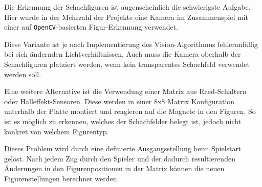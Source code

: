 Die Erkennung der Schachfiguren ist augenscheinlich die schwierigste
Aufgabe. Hier wurde in der Mehrzahl der Projekte eine Kamera im
Zusammenspiel mit einer auf \passthrough{\lstinline!OpenCV!}-basierten
Figur-Erkennung verwendet.

Diese Variante ist je nach Implementierung des Vision-Algorithmus
fehleranfällig bei sich ändernden Lichtverhältnissen. Auch muss die
Kamera oberhalb der Schachfiguren platziert werden, wenn kein
transparentes Schachfeld verwendet werden soll.

Eine weitere Alternative ist die Verwendung einer Matrix aus
Reed-Schaltern oder Halleffekt-Sensoren. Diese werden in einer 8x8
Matrix Konfiguration unterhalb der Platte montiert und reagieren auf die
Magnete in den Figuren. So ist es möglich zu erkennen, welches der
Schachfelder belegt ist, jedoch nicht konkret von welchem Figurentyp.

Dieses Problem wird durch eine definierte Ausgangsstellung beim
Spielstart gelöst. Nach jedem Zug durch den Spieler und der dadurch
resultierenden Änderungen in den Figurenpositionen in der Matrix können
die neuen Figurenstellungen berechnet werden.

\pagebreak


